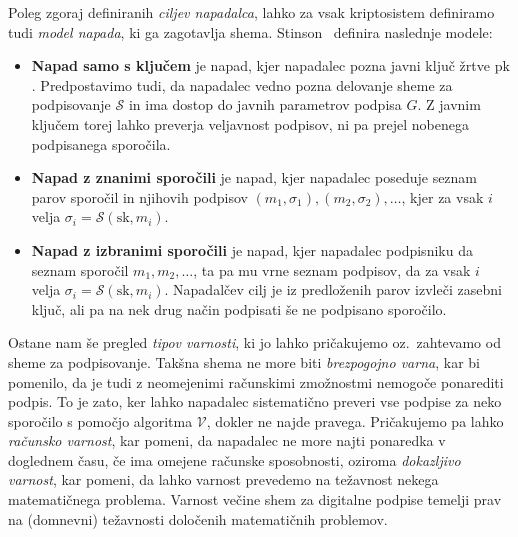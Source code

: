 \documentclass[isrm2, tisk]{fmfdelo}
\begin{document}
Poleg zgoraj definiranih \textit{ciljev napadalca}, lahko za vsak kriptosistem definiramo tudi
\textit{model napada}, ki ga zagotavlja shema. Stinson~\cite{stinson2023crypto} definira naslednje
modele:
\begin{itemize}
    \item \textbf{Napad samo s ključem} je napad, kjer napadalec pozna javni ključ žrtve $\text{pk}$. 
        Predpostavimo tudi, da napadalec vedno pozna delovanje sheme za podpisovanje $\mathcal{S}$
        in ima dostop do javnih parametrov podpisa $G$. Z javnim ključem torej lahko preverja
        veljavnost podpisov, ni pa prejel nobenega podpisanega sporočila.
    \item \textbf{Napad z znanimi sporočili} je napad, kjer napadalec poseduje seznam parov sporočil 
        in njihovih podpisov $(m_1, \sigma_1), (m_2, \sigma_2), \dots$, kjer za vsak $i$ velja 
        $\sigma_i = \mathcal{S}(\text{sk}, m_i)$.
    \item \textbf{Napad z izbranimi sporočili} je napad, kjer napadalec podpisniku da seznam sporočil $m_1,
        m_2, \dots$, ta pa mu vrne seznam podpisov, da za vsak $i$ velja $\sigma_i = \mathcal{S}(\text{sk}, 
        m_i)$. Napadalčev cilj je iz predloženih parov izvleči zasebni ključ, ali pa na nek drug način
        podpisati še ne podpisano sporočilo.
\end{itemize}

Ostane nam še pregled \textit{tipov varnosti}, ki jo lahko pričakujemo oz.\ zahtevamo od sheme za
podpisovanje. Takšna shema ne more biti \textit{brezpogojno varna}, kar bi pomenilo, da je tudi z
neomejenimi računskimi zmožnostmi nemogoče ponarediti podpis. To je zato, ker lahko napadalec
sistematično preveri vse podpise za neko sporočilo s pomočjo algoritma $\mathcal{V}$, dokler ne najde
pravega. Pričakujemo pa lahko \textit{računsko varnost}, kar pomeni, da napadalec ne more najti
ponaredka v doglednem času, če ima omejene računske sposobnosti, oziroma \textit{dokazljivo varnost},
kar pomeni, da lahko varnost prevedemo na težavnost nekega matematičnega problema. Varnost večine
shem za digitalne podpise temelji prav na (domnevni) težavnosti določenih matematičnih problemov.
\end{document}
